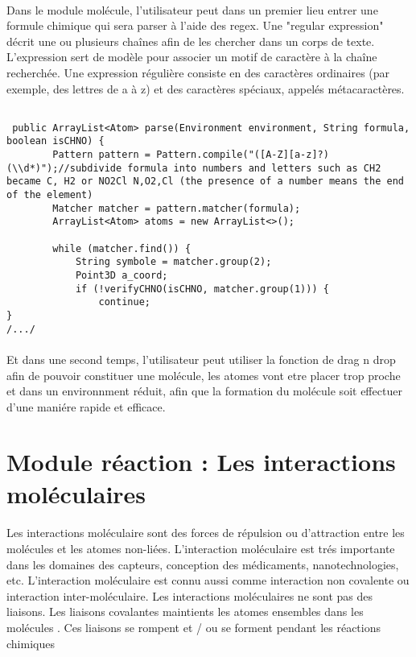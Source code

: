\paragraph{}
Dans le module molécule, l'utilisateur peut dans un premier lieu entrer une formule chimique qui sera parser à l'aide des regex.
Une "regular expression" décrit une ou plusieurs chaînes afin de les chercher dans un corps de texte. L'expression sert de modèle pour associer un motif de caractère à la chaîne recherchée.
Une expression régulière consiste en des caractères ordinaires (par exemple, des lettres de a à z) et des caractères spéciaux, appelés métacaractères.


\begin{lstlisting}

 public ArrayList<Atom> parse(Environment environment, String formula, boolean isCHNO) {
        Pattern pattern = Pattern.compile("([A-Z][a-z]?)(\\d*)");//subdivide formula into numbers and letters such as CH2 became C, H2 or NO2Cl N,O2,Cl (the presence of a number means the end of the element)
        Matcher matcher = pattern.matcher(formula);
        ArrayList<Atom> atoms = new ArrayList<>();

        while (matcher.find()) {
            String symbole = matcher.group(2);
            Point3D a_coord;
            if (!verifyCHNO(isCHNO, matcher.group(1))) {
                continue;
}
/.../
\end{lstlisting}
\paragraph{}
Et dans une second temps, l'utilisateur peut utiliser la fonction de drag n drop afin de pouvoir constituer une molécule, les atomes vont etre placer trop proche et dans un environnment réduit, afin que la formation du molécule soit effectuer d'une maniére rapide et efficace.

\section{ Module réaction : Les interactions moléculaires}

\paragraph{}
Les interactions moléculaire sont des forces de répulsion ou d'attraction entre les molécules et les atomes non-liées. L'interaction moléculaire est trés importante dans les domaines des capteurs, conception des médicaments, nanotechnologies, etc. L'interaction moléculaire est connu aussi comme interaction non covalente ou interaction inter-moléculaire. Les interactions moléculaires ne sont pas des liaisons. Les liaisons covalantes  maintients les atomes ensembles dans les molécules . Ces liaisons se rompent et / ou se forment pendant les réactions chimiques


